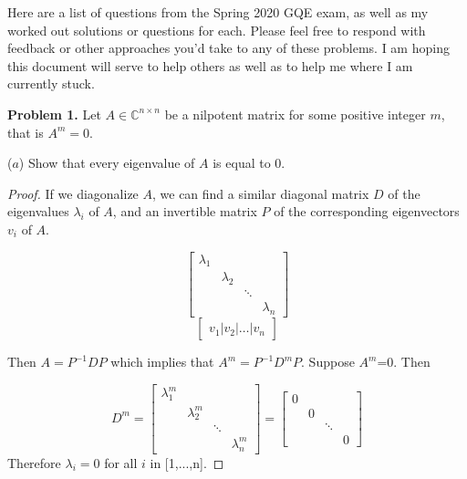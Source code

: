 \documentclass[12pt]{article}
\begin{document}
\begin{flushleft}Here are a list of questions from the Spring 2020 GQE exam, as well as my worked out solutions or questions for each. Please feel free to respond with feedback or other approaches you'd take to any of these problems. I am hoping this document will serve to help others as well as to help me where I am currently stuck.\end{flushleft}

\textbf{Problem 1.} Let $A \in \mathbb{C}^{n \times n}$ be a nilpotent matrix for some positive integer $m$, that is $A^{m}=0$.

\vspace{.2cm}

($a$) Show that every eigenvalue of $A$ is equal to 0. 

\vspace{.2cm}

\begin{proof}
If we diagonalize $A$, we can find a similar diagonal matrix $D$ of the eigenvalues 
$\lambda_{i}$ of $A$, and an invertible matrix $P$ of the corresponding eigenvectors $v_{i}$ of $A$.

$$
\begin{bmatrix}
\lambda_{1} & & &\\
& \lambda_{2} & & \\
& & \ddots & \\
& & & \lambda_{n} 
\end{bmatrix}
$$
\vspace{.2cm}
$$
\begin{bmatrix}
v_{1} | v_{2} | \dots | v_{n} 
\end{bmatrix}
$$

\begin{flushleft}Then $A=P^{-1}DP$ which implies that $A^{m}=P^{-1}D^{m}P$. Suppose $A^{m}$=0. Then \end{flushleft}
\[
D^{m}=
\begin{bmatrix}
\lambda_{1}^{m} & & &\\
& \lambda_{2}^{m} & & \\
& & \ddots & \\
& & & \lambda_{n}^{m} 
\end{bmatrix}
=
\begin{bmatrix}
0 & & & \\
& 0 & & \\
& & \ddots & \\
& & & 0
\end{bmatrix}
\]
Therefore $\lambda_{i}=0$ for all $i$ in [1,...,n]. 
\end{proof}
\end{document}
